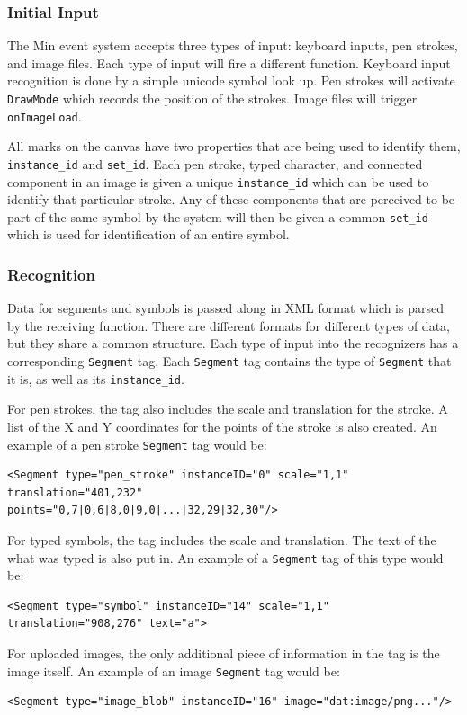 \documentclass[letterpaper]{article}
\begin{document}
\subsubsection*{Initial Input}
The Min event system accepts three types of input: keyboard inputs, pen strokes, and
image files. Each type of input will fire a different function. Keyboard input recognition
is done by a simple unicode symbol look up. Pen strokes will activate \verb+DrawMode+ which
records the position of the strokes. Image files will trigger \verb+onImageLoad+.

All marks on the canvas have two properties that are being used to identify them,
\verb+instance_id+ and \verb+set_id+. Each pen stroke, typed character, and connected
component in an image is given a unique \verb+instance_id+ which can be used to identify
that particular stroke. Any of these components that are perceived to be part of the same
symbol by the system will then be given a common \verb+set_id+ which is used for identification
of an entire symbol.

\subsubsection*{Recognition}
Data for segments and symbols is passed along in XML format which is parsed by the
receiving function. There are different formats for different types of data, but they share a
common structure. Each type of input into the recognizers has a corresponding \verb+Segment+
tag. Each \verb+Segment+ tag contains the type of \verb+Segment+ that it is, as well as its
\verb+instance_id+.

For pen strokes, the tag also includes the scale and translation for the stroke. A list of the
X and Y coordinates for the points of the stroke is also created. An example of a pen stroke
\verb+Segment+ tag would be:
\begin{verbatim}<Segment type="pen_stroke" instanceID="0" scale="1,1" translation="401,232"
points="0,7|0,6|8,0|9,0|...|32,29|32,30"/>\end{verbatim}

For typed symbols, the tag includes the scale and translation. The text of the what was typed
is also put in. An example of a \verb+Segment+ tag of this type would be:
\begin{verbatim}<Segment type="symbol" instanceID="14" scale="1,1" translation="908,276" text="a">\end{verbatim}

For uploaded images, the only additional piece of information in the tag is the image itself.
An example of an image \verb+Segment+ tag would be:
\begin{verbatim}<Segment type="image_blob" instanceID="16" image="dat:image/png..."/>\end{verbatim}
\end{document}

